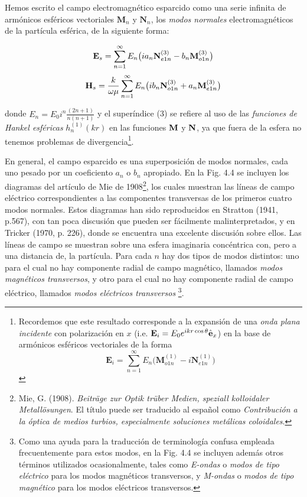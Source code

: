 \documentclass[graybox]{svmult}
\begin{document}
Hemos escrito el campo electromagnético esparcido como una serie infinita de armónicos esféricos vectoriales $\textbf{M}_n$ y $\textbf{N}_n$, los \textit{modos normales} electromagnéticos de la partícula esférica, de la siguiente forma:

$$ \bold{E}_s = \sum_{n=1}^{\infty} E_n \big ( i a_n \bold{N}_{e1n}^{(3)} - b_n \bold{M}_{o1n}^{(3)} \big ) $$
$$ \bold{H}_s = \frac{k}{\omega \mu} \sum_{n=1}^{\infty} E_n \big ( i b_n \bold{N}_{o1n}^{(3)} + a_n \bold{M}_{e1n}^{(3)} \big ) $$

donde $E_n = E_0 i^n \frac{(2n+1)}{n(n+1)}$ y el superíndice (3) se refiere al uso de las \textit{funciones de Hankel esféricas} $h_n^{(1)}(kr)$ en las funciones $\bold{M}$ y $\bold{N}$, ya que fuera de la esfera no tenemos problemas de divergencia\footnote{Recordemos que este resultado corresponde a la expansión de una \textit{onda plana incidente} con polarización en $x$ (i.e. $\textbf{E}_i = E_0 e^{ikr\cos{\theta}} \Hat{\textbf{e}}_x$) en la base de armónicos esféricos vectoriales de la forma $$\textbf{E}_i = \sum_{n=1}^{\infty} E_n \big ( \textbf{M}_{o1n}^{(1)} - i \textbf{N}_{e1n}^{(1)}  \big ) $$}.

En general, el campo esparcido es una superposición de modos normales, cada uno pesado por un coeficiento $a_n$ o $b_n$ apropiado. En la Fig. 4.4 se incluyen los diagramas del artículo de Mie de 1908\footnote{Mie, G. (1908). \textit{Beiträge zur Optik trüber Medien, speziall kolloidaler Metallösungen}. El título puede ser traducido al español como \textit{Contribución a la óptica de medios turbios, especialmente soluciones metálicas coloidales}.}, los cuales muestran las líneas de campo eléctrico correspondientes a las componentes transversas de los primeros cuatro modos normales. Estos diagramas han sido reproducidos en Stratton (1941, p.567), con tan poca discusión que pueden ser fácilmente malinterpretados, y en Tricker (1970, p. 226), donde se encuentra una excelente discusión sobre ellos. Las líneas de campo se muestran sobre una esfera imaginaria concéntrica con, pero a una distancia de, la partícula. Para cada $n$ hay dos tipos de modos distintos: uno para el cual no hay componente radial de campo magnético, llamados \textit{modos magnéticos transversos}, y otro para el cual no hay componente radial de campo eléctrico, llamados \textit{modos eléctricos transversos} \footnote{Como una ayuda para la traducción de terminología confusa empleada frecuentemente para estos modos, en la Fig. 4.4 se incluyen además otros términos utilizados ocasionalmente, tales como \textit{E-ondas} o \textit{modos de tipo eléctrico} para los modos magnéticos transversos, y \textit{M-ondas} o \textit{modos de tipo magnético} para los modos eléctricos transversos.}.
\end{document}
